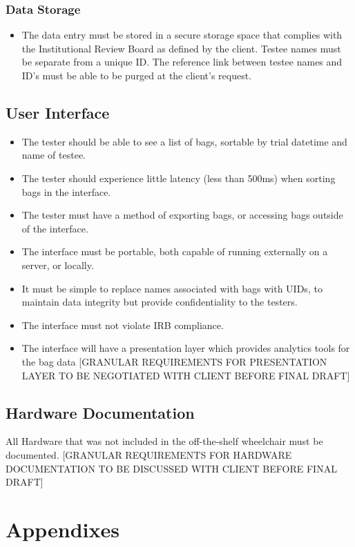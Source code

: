 \documentclass[onecolumn, draftclsnofoot,10pt, compsoc]{IEEEtran}
\begin{document}
\subsubsection{Data Storage}
\begin{itemize}
	\item The data entry must be stored in a secure storage space that complies with the Institutional Review Board as defined by the client.
	\subitem Testee names must be separate from a unique ID.
	\subitem The reference link between testee names and ID's must be able to be purged at the client's request.
\end{itemize}
\subsection{User Interface}
\begin{itemize}
	\item The tester should be able to see a list of bags, sortable by trial datetime and name of testee.
	\item The tester should experience little latency (less than 500ms) when sorting bags in the interface.
	\item The tester must have a method of exporting bags, or accessing bags outside of the interface.
	\item The interface must be portable, both capable of running externally on a server, or locally.
	\item It must be simple to replace names associated with bags with UIDs, to maintain data integrity but provide confidentiality to the testers.
	\item The interface must not violate IRB compliance.
	\item The interface will have a presentation layer which provides analytics tools for the bag data [GRANULAR REQUIREMENTS FOR PRESENTATION LAYER TO BE NEGOTIATED WITH CLIENT BEFORE FINAL DRAFT]
\end{itemize}
\subsection{Hardware Documentation}
All Hardware that was not included in the off-the-shelf wheelchair must be documented.
[GRANULAR REQUIREMENTS FOR HARDWARE DOCUMENTATION TO BE DISCUSSED WITH CLIENT BEFORE FINAL DRAFT]
\section{Appendixes}
\end{document}

